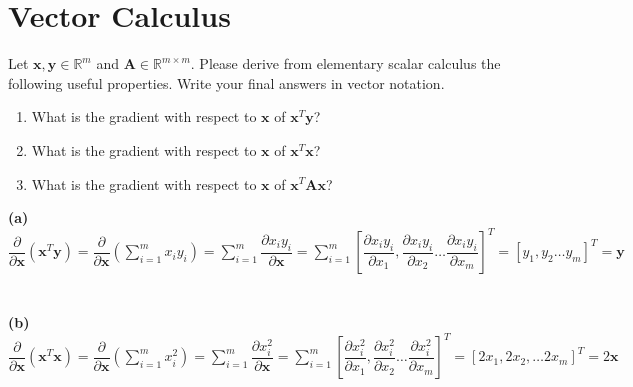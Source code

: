 \documentclass[submit]{harvardml}
\newcommand{\R}{\mathbb{R}}
\renewcommand{\v}[1]{\mathbf{#1}}
\begin{document}
\section*{Vector Calculus}
\begin{problem}
  Let $\v x, \v y \in \R^m$ and $\v A \in \R^{m \times m}$. Please derive from
  elementary scalar calculus the following useful properties. Write
  your final answers in vector notation.
\begin{enumerate}[label=(\alph*)]
    \item What is the gradient with respect to $\v x$ of $\v x^T \v y$?
    \item What is the gradient with respect to $\v x$ of $\v x^T \v x$?
    \item What is the gradient with respect to $\v x$ of $\v x^T \v A \v x$?
\end{enumerate}
\end{problem}




\textbf{(a)} \\

$\dfrac {\partial}{\partial \mathbf{x}}\left(\mathbf{x}^{T}\mathbf{y}\right) =\dfrac {\partial}{\partial \mathbf{x}}\left( \displaystyle\sum^{m}_{i=1}x_{i}y_{i}\right) =\displaystyle\sum^{m}_{i=1}\dfrac {\partial x_{i}y_{i}}{\partial \mathbf{x}}=\displaystyle\sum^{m}_{i=1}\left[ \dfrac {\partial x_{i}y_{i}}{\partial x_{1}},\dfrac {\partial x_{i}y_{i}}{\partial x_{2}}\ldots\dfrac {\partial x_{i}y_{i}}{\partial x_{m}}\right] ^{T}=\left[ y_{1},y_{2}\ldots y_{m}\right] ^{T}=\mathbf{y}$\\\\\\



\textbf{(b)} \\

$\dfrac {\partial}{\partial \mathbf{x}}\left( \mathbf{x}^{T}\mathbf{x}\right) =\dfrac {\partial}{\partial \mathbf{x}}\left( \displaystyle\sum^{m}_{i=1}x^{2}_{i}\right) =\displaystyle\sum^{m}_{i=1}\dfrac {\partial x^{2}_{i}}{\partial \mathbf{x}}=\displaystyle\sum^{m}_{i=1}\left[ \dfrac {\partial x^{2}_{i}}{\partial x_{1}},\dfrac {\partial x^{2}_{i}}{\partial x_{2}}\ldots\dfrac {\partial x^{2}_{i}}{\partial x_{m}}\right] ^{T}=\left[ 2x_{1},2x_{2},\ldots2x_{m}\right] ^{T}=2\mathbf{x}$\\\\\\
\end{document}
